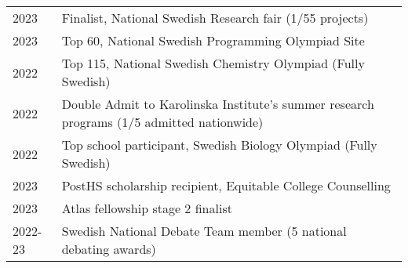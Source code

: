 
\begin{longtable}[l]{@{}p{} p{}}

    2023 & Finalist, National Swedish Research fair (1/55 projects) \\

    2023 & Top 60, National Swedish Programming Olympiad Site \\

    2022 & Top 115, National Swedish Chemistry Olympiad (Fully Swedish)\\

    2022 & Double Admit to Karolinska Institute's summer research programs (1/5 admitted nationwide)\\

    2022 & Top school participant, Swedish Biology Olympiad (Fully Swedish)\\

    2023 & PostHS scholarship recipient, Equitable College Counselling\\

    2023 & Atlas fellowship stage 2 finalist\\
   
    2022-23 & Swedish National Debate Team member (5 national debating awards)\\
   
\end{longtable}


